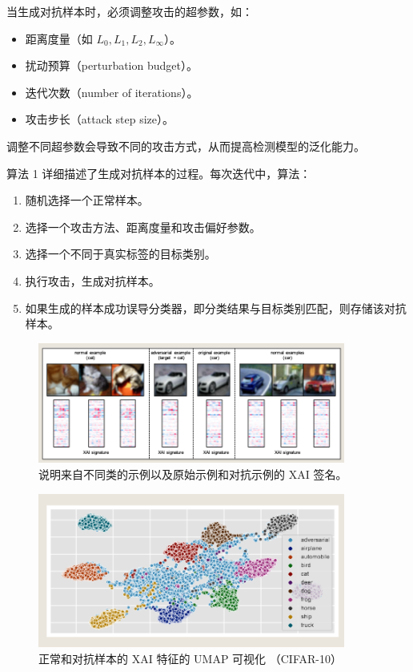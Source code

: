 \documentclass[12pt, a4paper]{ctexart} %
\begin{document}
当生成对抗样本时，必须调整攻击的超参数，如：
\begin{itemize}
    \item 距离度量（如 \( L_0, L_1, L_2, L_{\infty} \)）。
    \item 扰动预算（perturbation budget）。
    \item 迭代次数（number of iterations）。
    \item 攻击步长（attack step size）。
\end{itemize}

调整不同超参数会导致不同的攻击方式，从而提高检测模型的泛化能力。

算法 1 详细描述了生成对抗样本的过程。每次迭代中，算法：
\begin{enumerate}
    \item 随机选择一个正常样本。
    \item 选择一个攻击方法、距离度量和攻击偏好参数。
    \item 选择一个不同于真实标签的目标类别。
    \item 执行攻击，生成对抗样本。
    \item 如果生成的样本成功误导分类器，即分类结果与目标类别匹配，则存储该对抗样本。
\end{enumerate}

\begin{figure}[h]
    \centering
    \includegraphics[width=0.9\textwidth]{img/adversaries_2.png}
    \caption{说明来自不同类的示例以及原始示例和对抗示例的 XAI 签名。}
\end{figure}

\begin{figure}[h]
    \centering
    \includegraphics[width=0.9\textwidth]{img/adversaries_3.png}
    \caption{正常和对抗样本的 XAI 特征的 UMAP 可视化 （CIFAR-10）}
\end{figure}
\end{document}
